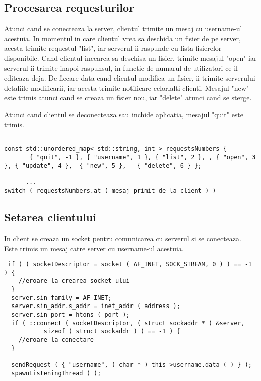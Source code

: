 \documentclass[runningheads]{llncs}
\begin{document}
\subsection{Procesarea requesturilor}

Atunci cand se conecteaza la server, clientul trimite un mesaj cu username-ul acestuia. In momentul in care clientul vrea sa deschida un fisier de pe server, acesta trimite requestul "list", iar serverul ii raspunde cu lista fisierelor disponibile. Cand clientul incearca sa deschisa un fisier, trimite mesajul "open" iar serverul ii trimite inapoi raspunsul, in functie de numarul de utilizatori ce il editeaza deja.
De fiecare data cand clientul modifica un fisier, ii trimite serverului detaliile modificarii, iar acesta trimite notificare celorlalti clienti. Mesajul "new" este trimis atunci cand se creaza un fisier nou, iar "delete" atunci cand se sterge. 

Atunci cand clientul se deconecteaza sau inchide aplicatia, mesajul "quit" este trimis.

\begin{lstlisting}

const std::unordered_map< std::string, int > requestsNumbers {
       { "quit", -1 }, { "username", 1 }, { "list", 2 }, , { "open", 3 }, { "update", 4 },	{ "new", 5 },	{ "delete", 6 } };
      
      ...
switch ( requestsNumbers.at ( mesaj primit de la client ) )

\end{lstlisting}

\subsection{Setarea clientului}

In client se creaza un socket pentru comunicarea cu serverul si se conecteaza. Este trimis un mesaj catre server cu username-ul acestuia. 

\begin{lstlisting}
 if ( ( socketDescriptor = socket ( AF_INET, SOCK_STREAM, 0 ) ) == -1 ) {
    //eroare la crearea socket-ului
  }
  server.sin_family = AF_INET;
  server.sin_addr.s_addr = inet_addr ( address );
  server.sin_port = htons ( port );
  if ( ::connect ( socketDescriptor, ( struct sockaddr * ) &server,
           sizeof ( struct sockaddr ) ) == -1 ) {
    //eroare la conectare
  }

  sendRequest ( { "username", ( char * ) this->username.data ( ) } );
  spawnListeningThread ( );

\end{lstlisting}
\end{document}
